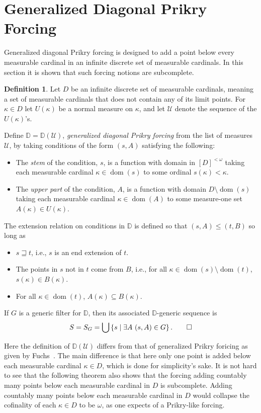\documentclass{amsart}
\theoremstyle{definition}
\newtheorem{definition}[theorem]{Definition}
\theoremstyle{remark}
\newcommand{\D}{\mathbb{D}}
\newcommand{\U}{\mathcal{U}}
\DeclareMathOperator{\dom}{dom}
\newcommand{\st}{\; | \;}
\newcommand{\set}[2]{\left\{#1\st #2 \right\}}
\begin{document}
\section{Generalized Diagonal Prikry Forcing}
\label{sec:GenDiagonalPrikryForcing}
Generalized diagonal Prikry forcing is designed to add a point below every measurable cardinal in an infinite discrete set of measurable cardinals. In this section it is shown that such forcing notions are subcomplete.
\begin{definition}
Let $D$ be an infinite discrete set of measurable cardinals, meaning a set of measurable cardinals that does not contain any of its limit points. For $\kappa \in D$ let $U(\kappa)$ be a normal measure on $\kappa$, and let $\U$ denote the sequence of the $U(\kappa)$'s.

Define $\D=\D(\U)$, \emph{generalized diagonal Prikry forcing} from the list of measures $\U$, by taking conditions of the form  
$( s, A )$ satisfying the following:
\begin{itemize}
	\item The \textit{stem} of the condition, $s$, is a function with domain in $[D]^{<\omega}$ taking each measurable cardinal $\kappa \in \dom(s)$ to some ordinal $s(\kappa) < \kappa$.
	\item The \textit{upper part} of the condition, $A$, is a function with domain $D \setminus {\dom(s)}$ taking each measurable cardinal $\kappa \in \dom(A)$ to some measure-one set $A(\kappa) \in U(\kappa)$.
\end{itemize}
The extension relation on conditions in $\D$ is defined so that $( s, A ) \leq ( t, B )$ so long as 
\begin{itemize}
	\item $s \sqsupseteq t$, i.e., $s$ is an end extension of $t$.
	\item The points in $s$ not in $t$ come from $B$, i.e., for all $\kappa \in \dom(s) \setminus \dom(t)$, $s(\kappa) \in B(\kappa)$.
	\item For all $\kappa \in \dom(t)$, $A(\kappa) \subseteq B(\kappa)$.
\end{itemize}
If $G$ is a generic filter for $\D$, then its associated $\D$-generic sequence is \[S = S_G = \bigcup \set{ s }{ \exists A \ ( s, A ) \in G }.\qedhere\]
\end{definition}

Here the definition of $\D(\U)$ differs from that of generalized Prikry foricing as given by Fuchs~\cite{Fuchs:2005kx}. The main difference is that here only one point is added below each measurable cardinal $\kappa \in D$, which is done for simplicity's sake. It is not hard to see that the following theorem also shows that the forcing adding countably many points below each measurable cardinal in $D$ is subcomplete. Adding countably many points below each measurable cardinal in $D$ would collapse the cofinality of each $\kappa \in D$ to be $\omega$, as one expects of a Prikry-like forcing. %
\end{document}
